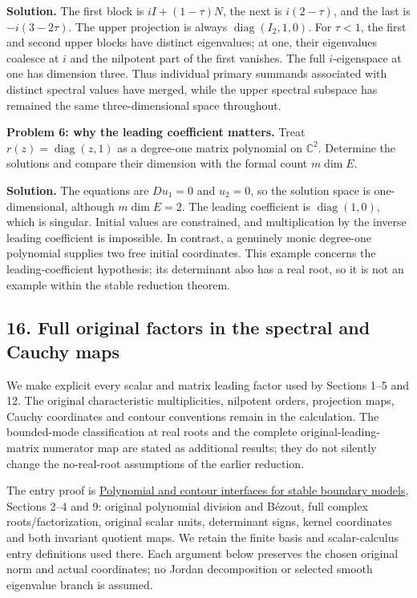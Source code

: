 \documentclass[
  11pt,
]{article}
\begin{document}
\textbf{Solution.} The first block is \(iI+(1-\tau)N\), the next is
\(i(2-\tau)\), and the last is \(-i(3-2\tau)\). The upper projection is
always \(\operatorname{diag}(I_2,1,0)\). For \(\tau<1\), the first and
second upper blocks have distinct eigenvalues; at one, their eigenvalues
coalesce at \(i\) and the nilpotent part of the first vanishes. The full
\(i\)-eigenspace at one has dimension three. Thus individual primary
summands associated with distinct spectral values have merged, while the
upper spectral subspace has remained the same three-dimensional space
throughout.

\textbf{Problem 6: why the leading coefficient matters.} Treat
\(r(z)=\operatorname{diag}(z,1)\) as a degree-one matrix polynomial on
\(\mathbb C^2\). Determine the solutions and compare their dimension
with the formal count \(m\dim E\).

\textbf{Solution.} The equations are \(Du_1=0\) and \(u_2=0\), so the
solution space is one-dimensional, although \(m\dim E=2\). The leading
coefficient is \(\operatorname{diag}(1,0)\), which is singular. Initial
values are constrained, and multiplication by the inverse leading
coefficient is impossible. In contrast, a genuinely monic degree-one
polynomial supplies two free initial coordinates. This example concerns
the leading-coefficient hypothesis; its determinant also has a real
root, so it is not an example within the stable reduction theorem.

\subsection{16. Full original factors in the spectral and Cauchy
maps}\label{full-original-factors-in-the-spectral-and-cauchy-maps}

We make explicit every scalar and matrix leading factor used by Sections
1--5 and 12. The original characteristic multiplicities, nilpotent
orders, projection maps, Cauchy coordinates and contour conventions
remain in the calculation. The bounded-mode classification at real roots
and the complete original-leading-matrix numerator map are stated as
additional results; they do not silently change the no-real-root
assumptions of the earlier reduction.

The entry proof is \href{stable-prerequisite-bridges.pdf}{Polynomial and
contour interfaces for stable boundary models}, Sections 2--4 and 9:
original polynomial division and Bézout, full complex
roots/factorization, original scalar units, determinant signs, kernel
coordinates and both invariant quotient maps. We retain the finite basis
and scalar-calculus entry definitions used there. Each argument below
preserves the chosen original norm and actual coordinates; no Jordan
decomposition or selected smooth eigenvalue branch is assumed.
\end{document}
